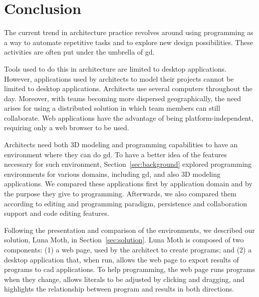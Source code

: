 
\section{Conclusion}
\label{sec:conclusion}


The current trend in architecture practice revolves around using programming as a way to automate repetitive tasks and to explore new design possibilities.
These activities are often put under the umbrella of \acrfull{gd}.

Tools used to do this in architecture are limited to desktop applications.
However, applications used by architects to model their projects cannot be limited to desktop applications.
Architects use several computers throughout the day.
Moreover, with teams becoming more dispersed geographically, the need arises for using a distributed solution in which team members can still collaborate.
Web applications have the advantage of being platform-independent, requiring only a web browser to be used.

Architects need both 3D modeling and programming capabilities to have an environment where they can do \gls{gd}.
To have a better idea of the features necessary for such environment, Section~\ref{sec:background} explored programming environments for various domains, including \gls{gd}, and also 3D modeling applications.
We compared these applications first by application domain and by the purpose they give to programming.
Afterwards, we also compared them according to editing and programming paradigm, persistence and collaboration support and code editing features.

Following the presentation and comparison of the environments, we described our solution, Luna Moth, in Section~\ref{sec:solution}.
Luna Moth is composed of two components:
(1) a web page, used by the architect to create programs;
and (2) a desktop application that, when run, allows the web page to export results of programs to \gls{cad} applications.
To help programming, the web page runs programs when they change, allows literals to be adjusted by clicking and dragging, and highlights the relationship between program and results in both directions.

